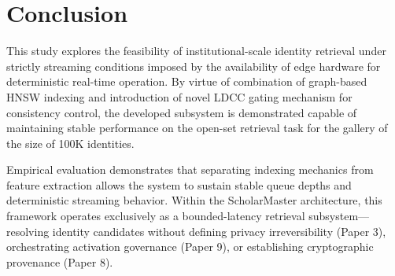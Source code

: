 \documentclass[conference]{IEEEtran}
\begin{document}
\section{Conclusion}
This study explores the feasibility of institutional-scale identity retrieval under strictly streaming conditions imposed by the availability of edge hardware for deterministic real-time operation. By virtue of combination of graph-based HNSW indexing and introduction of novel LDCC gating mechanism for consistency control, the developed subsystem is demonstrated capable of maintaining stable performance on the open-set retrieval task for the gallery of the size of 100K identities.

Empirical evaluation demonstrates that separating indexing mechanics from feature extraction allows the system to sustain stable queue depths and deterministic streaming behavior. Within the ScholarMaster architecture, this framework operates exclusively as a bounded-latency retrieval subsystem---resolving identity candidates without defining privacy irreversibility (Paper 3), orchestrating activation governance (Paper 9), or establishing cryptographic provenance (Paper 8).
\end{document}
